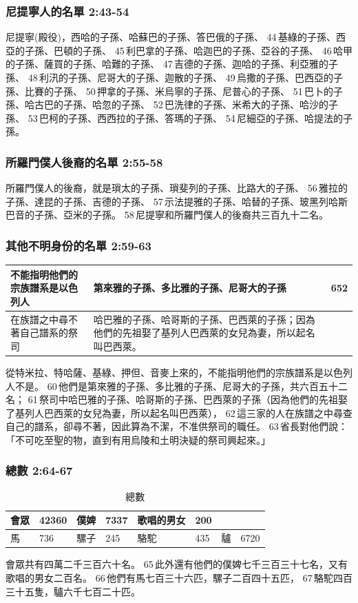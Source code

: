 \subsubsection{尼提寧人的名單 2:43-54}
尼提寧(殿役)，西哈的子孫、哈蘇巴的子孫、答巴俄的子孫、 44 基綠的子孫、西亞的子孫、巴頓的子孫、 45 利巴拿的子孫、哈迦巴的子孫、亞谷的子孫、 46 哈甲的子孫、薩買的子孫、哈難的子孫、 47 吉德的子孫、迦哈的子孫、利亞雅的子孫、 48 利汛的子孫、尼哥大的子孫、迦散的子孫、 49 烏撒的子孫、巴西亞的子孫、比賽的子孫、 50 押拿的子孫、米烏寧的子孫、尼普心的子孫、 51 巴卜的子孫、哈古巴的子孫、哈忽的子孫、 52 巴洗律的子孫、米希大的子孫、哈沙的子孫、 53 巴柯的子孫、西西拉的子孫、答瑪的子孫、 54 尼細亞的子孫、哈提法的子孫。

\subsubsection{所羅門僕人後裔的名單 2:55-58}
所羅門僕人的後裔，就是瑣太的子孫、瑣斐列的子孫、比路大的子孫、 56 雅拉的子孫、達昆的子孫、吉德的子孫、 57 示法提雅的子孫、哈替的子孫、玻黑列哈斯巴音的子孫、亞米的子孫。 58 尼提寧和所羅門僕人的後裔共三百九十二名。

\subsubsection{其他不明身份的名單 2:59-63}
\begin{table}[H]
\centering 
\begin{tabular}{p{4cm}|p{10cm}|p{1cm}}
\hline
\hline
不能指明他們的宗族譜系是以色列人&第來雅的子孫、多比雅的子孫、尼哥大的子孫 & 652\\\hline
在族譜之中尋不著自己譜系的祭司&哈巴雅的子孫、哈哥斯的子孫、巴西萊的子孫；因為他們的先祖娶了基列人巴西萊的女兒為妻，所以起名叫巴西萊。&\\\hline
\end{tabular}
\end{table}
從特米拉、特哈薩、基綠、押但、音麥上來的，不能指明他們的宗族譜系是以色列人不是。 60 他們是第來雅的子孫、多比雅的子孫、尼哥大的子孫，共六百五十二名； 61 祭司中哈巴雅的子孫、哈哥斯的子孫、巴西萊的子孫（因為他們的先祖娶了基列人巴西萊的女兒為妻，所以起名叫巴西萊）， 62 這三家的人在族譜之中尋查自己的譜系，卻尋不著，因此算為不潔，不准供祭司的職任。 63 省長對他們說：「不可吃至聖的物，直到有用烏陵和土明決疑的祭司興起來。」

\subsubsection{總數 2:64-67}
\begin{table}[H]
\centering 
\begin{tabular}{p{1.5cm}|p{1.5cm}|p{1.5cm}|p{1.5cm}|p{2cm}|p{1.5cm}|p{1.5cm}|p{2cm}}
\hline
\hline
會眾 & 42360&僕婢& 7337&歌唱的男女&200&&  \\\hline
馬&736 &  騾子&245&駱駝&435&  驢&6720\\\hline
\end{tabular}
\caption{總數}
\end{table}
會眾共有四萬二千三百六十名。 65 此外還有他們的僕婢七千三百三十七名，又有歌唱的男女二百名。 66 他們有馬七百三十六匹，騾子二百四十五匹， 67 駱駝四百三十五隻，驢六千七百二十匹。

